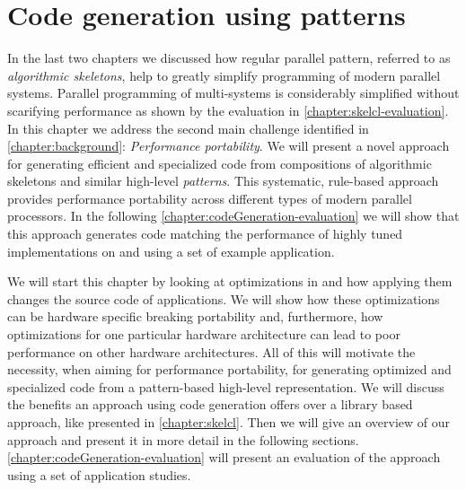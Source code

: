 
\chapter{Code generation using patterns}

\label{ch:fifth} %
\label{chapter:codeGeneration}

In the last two chapters we discussed how regular parallel pattern, referred to as \emph{algorithmic skeletons}, help to greatly simplify programming of modern parallel systems.
Parallel programming of multi-\GPU systems is considerably simplified without scarifying performance as shown by the evaluation in \autoref{chapter:skelcl-evaluation}.
In this chapter we address the second main challenge identified in \autoref{chapter:background}: \emph{Performance portability}.
We will present a novel approach for generating efficient and specialized code from compositions of algorithmic skeletons and similar high-level \emph{patterns}.
This systematic, rule-based approach provides performance portability across different types of modern parallel processors. 
In the following \autoref{chapter:codeGeneration-evaluation} we will show that this approach generates code matching the performance of highly tuned implementations on \CPUs and \GPUs using a set of example application.

We will start this chapter by looking at optimizations in \OpenCL and how applying them changes the source code of applications.
We will show how these optimizations can be hardware specific breaking portability and, furthermore, how optimizations for one particular hardware architecture can lead to poor performance on other hardware architectures.
All of this will motivate the necessity, when aiming for performance portability, for generating optimized and specialized code from a pattern-based high-level representation.
We will discuss the benefits an approach using code generation offers over a library based approach, like \SkelCL presented in \autoref{chapter:skelcl}.
Then we will give an overview of our approach and present it in more detail in the following sections.
\autoref{chapter:codeGeneration-evaluation} will present an evaluation of the approach using a set of application studies.





